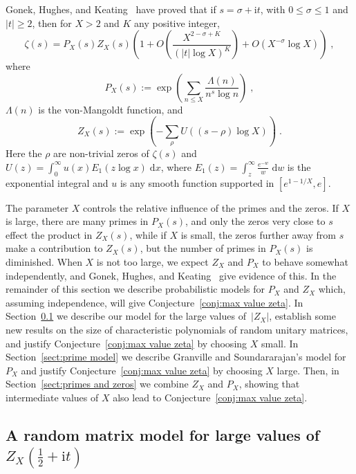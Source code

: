 \documentclass[10pt,reqno,twoside]{amsart}
\renewcommand{\d}{{\mathrm{d}}} %
\renewcommand{\i}{{\mathrm{i}}} %
\numberwithin{equation}{section}
\numberwithin{theorem}{section}
\begin{document}
{{Gonek, Hughes, and Keating~\cite{GHK} have proved that if $s=\sigma+\i
t$, with $0\leq\sigma\leq 1$ and $|t|\geq 2$, then for $X>2$ and $K$
any positive integer,
\begin{equation}\label{eq:zeta= PZ}
    \zeta(s) = P_X(s) Z_X(s) \left(1+O\left(\frac{X^{2-\sigma+K}}{(|t|
    \log X)^{K}}\right)+O(X^{-\sigma}\log X)\right)\;,
\end{equation}
where
\begin{equation}\label{eq:P_X}
P_X(s) := \exp\left(\sum_{n\leq X}\frac{\Lambda(n)}{n^{s}\log n}
\right)\;,
\end{equation}
$\Lambda(n)$ is the von-Mangoldt function, and
\begin{equation}\label{eq:Z_X}
Z_X(s):= \exp\left(-\sum_{\rho}U((s-\rho)\log X)\right)\;.
\end{equation}
Here the $\rho$ are non-trivial zeros of $\zeta(s)$ and $U(z) =
\int_0^\infty u(x) E_1(z\log x)\;\d x$, where $E_1(z) =
\int_{z}^{\infty} \frac{e^{-w}}{w}\;\d w$ is the exponential
integral and $u$ is any smooth function supported in $[e^{1-1/X}
, e]$.

The parameter $X$ controls the relative influence of the primes
and the zeros. If $X$ is large, there are many primes in $P_X(s)$,
and only the zeros very close to $s$ effect the product in
$Z_X(s)$, while if $X$ is small, the zeros further away from $s$
make a contribution to $Z_X(s)$, but the number of primes in
$P_X(s)$ is diminished. When $X$ is not too large,
we expect  $Z_X$ and $P_X$ to behave somewhat
independently,  and  Gonek, Hughes, and Keating~\cite{GHK}
give evidence of this. In the remainder of this section we describe
probabilistic models for $P_X$ and $Z_X$ which, assuming independence, will give
Conjecture~\ref{conj:max value zeta}.
In Section~\ref{sect:char poly} we describe our model
for the large values of~$|Z_X|$,
establish some new results on the size of characteristic
polynomials of random unitary matrices, and justify
Conjecture~\ref{conj:max value zeta} by choosing $X$ small.  In
Section~\ref{sect:prime model} we describe Granville and Soundararajan's
model for $P_X$ and justify Conjecture~\ref{conj:max value zeta} by choosing
$X$ large.  Then, in Section~\ref{sect:primes and zeros}
we combine $Z_X$ and $P_X$, showing that intermediate values of $X$
also lead to Conjecture~\ref{conj:max value zeta}.

\subsection{A random matrix model for large values of $Z_X(\frac12+\i t)$}\label{sect:char poly}

}}
\end{document}

